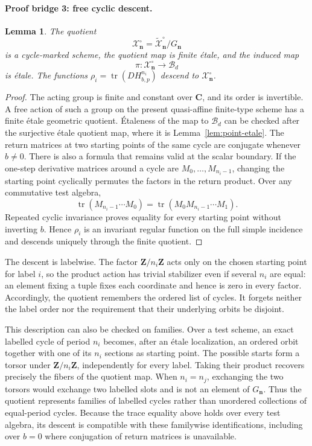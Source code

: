 \documentclass[11pt]{article}
\newtheorem{lemma}[theorem]{Lemma}
\theoremstyle{definition}
\theoremstyle{remark}
\newcommand{\C}{\mathbf C}
\newcommand{\Z}{\mathbf Z}
\newcommand{\cB}{\mathcal B}
\newcommand{\cX}{\mathcal X}
\newcommand{\tX}{\widetilde{\mathcal X}}
\newcommand{\bn}{\mathbf n}
\newcommand{\tr}{\operatorname{tr}}
\begin{document}
\paragraph{Proof bridge 3: free cyclic descent.}

\begin{lemma}
\label{lem:cycle-quotient}
The quotient
\[
  \cX_{\bn}^{\circ}
  =
  \tX_{\bn}^{\circ}/G_{\bn}
\]
is a cycle-marked scheme, the quotient map is finite étale, and the induced
map
\[
  \pi:\cX_{\bn}^{\circ}\longrightarrow\cB_d
\]
is étale.  The functions $\rho_i=\tr(DH_{b,p}^{n_i})$ descend to
$\cX_{\bn}^{\circ}$.
\end{lemma}

\begin{proof}
The acting group is finite and constant over $\C$, and its order is
invertible.  A free action of such a group on the present quasi-affine
finite-type scheme has a finite étale geometric quotient.  Étaleness of the
map to $\cB_d$ can be checked after the surjective étale quotient map, where
it is Lemma~\ref{lem:point-etale}.  The return matrices at two starting
points of the same cycle are conjugate whenever $b\neq0$.  There is also a
formula that remains valid at the scalar boundary.  If the one-step
derivative matrices around a cycle are $M_0,\ldots,M_{n_i-1}$, changing the
starting point cyclically permutes the factors in the return product.  Over
any commutative test algebra,
\[
  \tr(M_{n_i-1}\cdots M_0)
  =\tr(M_0M_{n_i-1}\cdots M_1).
\]
Repeated cyclic invariance proves equality for every starting point without
inverting $b$.  Hence $\rho_i$ is an invariant regular function on the full
simple incidence and descends uniquely through the finite quotient.
\end{proof}

The descent is labelwise.  The factor $\Z/n_i\Z$ acts only on the chosen
starting point for label $i$, so the product action has trivial stabilizer
even if several $n_i$ are equal: an element fixing a tuple fixes each
coordinate and hence is zero in every factor.  Accordingly, the quotient
remembers the ordered list of cycles.  It forgets neither the label order nor
the requirement that their underlying orbits be disjoint.

This description can also be checked on families.  Over a test scheme, an
exact labelled cycle of period $n_i$ becomes, after an étale localization,
an ordered orbit together with one of its $n_i$ sections as starting point.
The possible starts form a torsor under $\Z/n_i\Z$, independently for every
label.  Taking their product recovers precisely the fibers of the quotient
map.  When $n_i=n_j$, exchanging the two torsors would exchange two labelled
slots and is not an element of $G_{\bn}$.  Thus the quotient represents
families of labelled cycles rather than unordered collections of equal-period
cycles.  Because the trace equality above holds over every test algebra, its
descent is compatible with these familywise identifications, including over
$b=0$ where conjugation of return matrices is unavailable.
\end{document}
